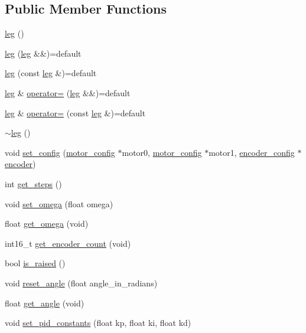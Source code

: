 \subsection*{Public Member Functions}
\begin{DoxyCompactItemize}
\item 
\mbox{\hyperlink{classleg_a418877dece641560d83d01fa236ec8a4}{leg}} ()
\item 
\mbox{\hyperlink{classleg_a880c3eda57ee576b1c091e09c8679096}{leg}} (\mbox{\hyperlink{classleg}{leg}} \&\&)=default
\item 
\mbox{\hyperlink{classleg_a855f8b6bb7b32343290bddf9b7af2ab1}{leg}} (const \mbox{\hyperlink{classleg}{leg}} \&)=default
\item 
\mbox{\hyperlink{classleg}{leg}} \& \mbox{\hyperlink{classleg_a4fe626ec8260c58442d0bf4f6e092e57}{operator=}} (\mbox{\hyperlink{classleg}{leg}} \&\&)=default
\item 
\mbox{\hyperlink{classleg}{leg}} \& \mbox{\hyperlink{classleg_ad689d8f971733486c26cc2df5b740bc2}{operator=}} (const \mbox{\hyperlink{classleg}{leg}} \&)=default
\item 
\mbox{\hyperlink{classleg_abdce802c51dbf118f404973d796dd2d3}{$\sim$leg}} ()
\item 
void \mbox{\hyperlink{classleg_aee2ceb15630cf35d5bc69959da270e51}{set\+\_\+config}} (\mbox{\hyperlink{structmotor__config}{motor\+\_\+config}} $\ast$motor0, \mbox{\hyperlink{structmotor__config}{motor\+\_\+config}} $\ast$motor1, \mbox{\hyperlink{structencoder__config}{encoder\+\_\+config}} $\ast$\mbox{\hyperlink{classencoder}{encoder}})
\item 
int \mbox{\hyperlink{classleg_a36761ba08ae602b76c4adf168d2ae531}{get\+\_\+steps}} ()
\item 
void \mbox{\hyperlink{classleg_a0b0845622d8b17f34739b390846bf957}{set\+\_\+omega}} (float omega)
\item 
float \mbox{\hyperlink{classleg_a90a92add134cc7f610202ae703ed8857}{get\+\_\+omega}} (void)
\item 
int16\+\_\+t \mbox{\hyperlink{classleg_ab7d470db701c7745266338157b79e1d0}{get\+\_\+encoder\+\_\+count}} (void)
\item 
bool \mbox{\hyperlink{classleg_aa82b5f0d5d173b0b6202c2e0ac207aeb}{is\+\_\+raised}} ()
\item 
void \mbox{\hyperlink{classleg_add86097d69f6780c1c651693aac6fa4e}{reset\+\_\+angle}} (float angle\+\_\+in\+\_\+radians)
\item 
float \mbox{\hyperlink{classleg_a0f98905721d2f20536b7dc908597263e}{get\+\_\+angle}} (void)
\item 
void \mbox{\hyperlink{classleg_af28c31cfef29472bc1392af5ad48b97b}{set\+\_\+pid\+\_\+constants}} (float kp, float ki, float kd)
\end{DoxyCompactItemize}
